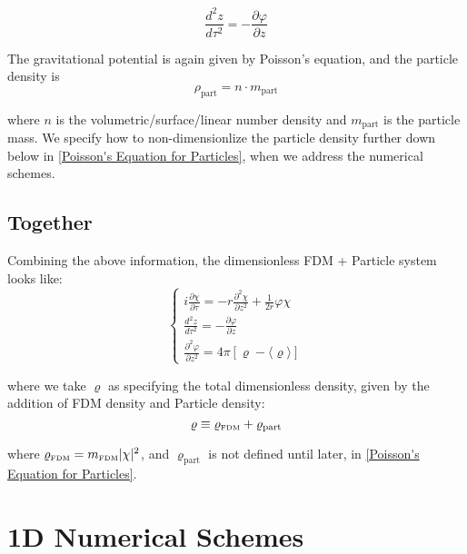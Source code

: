 \documentclass[oneside]{book}
\newcommand{\pd}{\partial}
\begin{document}
\begin{equation}
    \frac{d^2 z}{d\tau^2} = -\frac{\pd \varphi}{\pd z}
\end{equation}

The gravitational potential is again given by Poisson's equation, and the particle density is 
\begin{equation}
\rho_\text{part} = n \cdot m_{\text{part}}
\label{Particle density}
\end{equation}

where $n$ is the volumetric/surface/linear number density and $m_{\text{part}}$ is the particle mass. We specify how to non-dimensionlize the particle density further down below in \cref{Poisson's Equation for Particles}, when we address the numerical schemes.
    
\section{Together}\label{Together}
Combining the above information, the dimensionless FDM + Particle system looks like:
\begin{equation}
    \begin{cases}
    i\frac{\pd \chi}{\pd \tau} = -r\frac{\pd^2 \chi}{\pd z^2} + \frac{1}{2r}\varphi\chi \\
    
    \frac{d^2 z}{d\tau^2} = -\frac{\pd \varphi}{\pd z}\\
    
    \frac{\pd^2 \varphi}{\pd z^2} = 4\pi \left[{\varrho} - \langle{\varrho}\rangle\right]
    \end{cases}
    \label{FULL-NonDim}
\end{equation}

where we take ${\varrho}$ as specifying the total dimensionless density, given by the addition of FDM density and Particle density:
\begin{equation}
    \varrho \equiv \varrho_\text{\tiny{FDM}} + \varrho_\text{part} 
\end{equation}

where $\varrho_\text{\tiny{FDM}} = m_\text{\tiny{FDM}}|\chi|^2$, and $\varrho_\text{part}$ is not defined until later, in \cref{Poisson's Equation for Particles}.
\chapter{1D Numerical Schemes}
\end{document}
